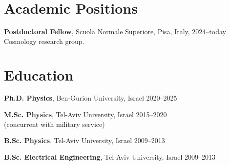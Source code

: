 \documentclass[letterpaper,12pt]{article}
\renewenvironment{itemize}{
  \begin{list}{}{
    \setlength{\leftmargin}{1.5em}
  }
}{
  \end{list}
}
\begin{document}
\section*{Academic Positions}

\begin{itemize}
\item {\bf Postdoctoral Fellow}, Scuola Normale Superiore, Pisa, Italy, \hfill 2024--today\\ 
 	Cosmology research group.

\end{itemize}

\vspace{-5mm}
\section*{Education}

\begin{itemize}
\item {\bf Ph.D. Physics}, Ben-Gurion University, Israel \hfill 2020--2025

\item {\bf M.Sc. Physics}, Tel-Aviv University, Israel \hfill 2015--2020\\
(concurrent with military service)
\item {\bf B.Sc. Physics}, Tel-Aviv University, Israel \hfill 2009--2013
\item {\bf B.Sc. Electrical Engineering}, Tel-Aviv University, Israel \hfill 2009--2013
\end{itemize}

\vspace{-5mm}
\end{document}
